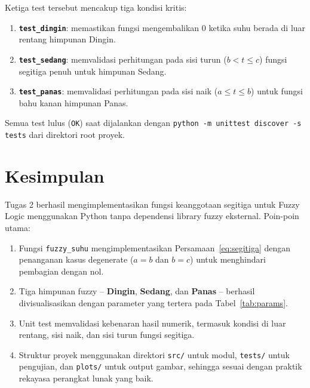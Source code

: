 \documentclass{article}
\begin{document}
Ketiga test tersebut mencakup tiga kondisi kritis:
\begin{enumerate}
  \item \textbf{\texttt{test\_dingin}}: memastikan fungsi mengembalikan 0
        ketika suhu berada di luar rentang himpunan Dingin.
  \item \textbf{\texttt{test\_sedang}}: memvalidasi perhitungan pada sisi turun
        ($b < t \le c$) fungsi segitiga penuh untuk himpunan Sedang.
  \item \textbf{\texttt{test\_panas}}: memvalidasi perhitungan pada sisi naik
        ($a \le t \le b$) untuk fungsi bahu kanan himpunan Panas.
\end{enumerate}

Semua test lulus (\texttt{OK}) saat dijalankan dengan
\texttt{python -m unittest discover -s tests} dari direktori root proyek.

\section*{Kesimpulan}

Tugas 2 berhasil mengimplementasikan fungsi keanggotaan segitiga untuk Fuzzy Logic
menggunakan Python tanpa dependensi library fuzzy eksternal. Poin-poin utama:

\begin{enumerate}
  \item Fungsi \texttt{fuzzy\_suhu} mengimplementasikan Persamaan~\ref{eq:segitiga}
        dengan penanganan kasus degenerate ($a = b$ dan $b = c$) untuk menghindari
        pembagian dengan nol.
  \item Tiga himpunan fuzzy -- \textbf{Dingin}, \textbf{Sedang}, dan \textbf{Panas} --
        berhasil divisualisasikan dengan parameter yang tertera pada
        Tabel~\ref{tab:params}.
  \item Unit test memvalidasi kebenaran hasil numerik, termasuk kondisi di luar
        rentang, sisi naik, dan sisi turun fungsi segitiga.
  \item Struktur proyek menggunakan direktori \texttt{src/} untuk modul,
        \texttt{tests/} untuk pengujian, dan \texttt{plots/} untuk output gambar,
        sehingga sesuai dengan praktik rekayasa perangkat lunak yang baik.
\end{enumerate}



\end{document}

